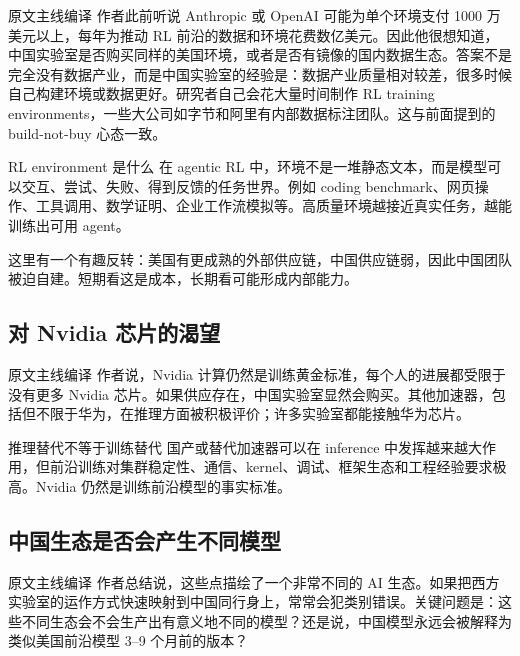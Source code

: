 \documentclass[a4paper]{article}
\begin{document}
\begin{translationbox}{原文主线编译}
作者此前听说 Anthropic 或 OpenAI 可能为单个环境支付 1000 万美元以上，每年为推动 RL 前沿的数据和环境花费数亿美元。因此他很想知道，中国实验室是否购买同样的美国环境，或者是否有镜像的国内数据生态。答案不是完全没有数据产业，而是中国实验室的经验是：数据产业质量相对较差，很多时候自己构建环境或数据更好。研究者自己会花大量时间制作 RL training environments，一些大公司如字节和阿里有内部数据标注团队。这与前面提到的 build-not-buy 心态一致。
\end{translationbox}

\begin{knowledgebox}{RL environment 是什么}
在 agentic RL 中，环境不是一堆静态文本，而是模型可以交互、尝试、失败、得到反馈的任务世界。例如 coding benchmark、网页操作、工具调用、数学证明、企业工作流模拟等。高质量环境越接近真实任务，越能训练出可用 agent。
\end{knowledgebox}

这里有一个有趣反转：美国有更成熟的外部供应链，中国供应链弱，因此中国团队被迫自建。短期看这是成本，长期看可能形成内部能力。

\subsection{对 Nvidia 芯片的渴望}

\begin{translationbox}{原文主线编译}
作者说，Nvidia 计算仍然是训练黄金标准，每个人的进展都受限于没有更多 Nvidia 芯片。如果供应存在，中国实验室显然会购买。其他加速器，包括但不限于华为，在推理方面被积极评价；许多实验室都能接触华为芯片。
\end{translationbox}

\begin{warningbox}{推理替代不等于训练替代}
国产或替代加速器可以在 inference 中发挥越来越大作用，但前沿训练对集群稳定性、通信、kernel、调试、框架生态和工程经验要求极高。Nvidia 仍然是训练前沿模型的事实标准。
\end{warningbox}

\subsection{中国生态是否会产生不同模型}

\begin{translationbox}{原文主线编译}
作者总结说，这些点描绘了一个非常不同的 AI 生态。如果把西方实验室的运作方式快速映射到中国同行身上，常常会犯类别错误。关键问题是：这些不同生态会不会生产出有意义地不同的模型？还是说，中国模型永远会被解释为类似美国前沿模型 3--9 个月前的版本？
\end{translationbox}
\end{document}
